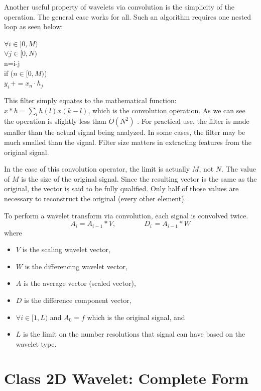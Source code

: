 Another useful property of wavelets via convolution is the simplicity
of the operation. The general case works for all.  Such an algorithm
requires one nested loop as seen below:

\begin{tt}
\begin{tabbing}
$\forall i\in \lbrack 0,M)$ \\
\qquad $\forall j\in \lbrack 0,N)$ \\
\qquad \qquad n=i-j \\
\qquad \qquad if ($n\in \lbrack 0,M)$) \\
\qquad \qquad \qquad $y_{i\,}+=x_{n}\cdot h_{j\,}$
\end{tabbing}
\end{tt}

This filter simply equates to the mathematical function: $x\ast
h=\sum_{l}h(l)x(k-l)$, which is the convolution operation. As we can
see the operation is slightly less than $O(N^{2})$ . For practical
use, the filter is made smaller than the actual signal being
analyzed. In some cases, the filter may be much smalled than the
signal. Filter size matters in extracting features from the original
signal.

In the case of this convolution operator, the limit is actually $M$, not
$N$.  The value of $M$ is the size of the original signal. Since the
resulting vector is the same as the original, the vector is said to be
fully qualified. Only half of those values are necessary to
reconstruct the original (every other element).

To perform a wavelet transform via convolution, each signal is
convolved twice.
\[
A_{i}=A_{i-1}\ast V,
\qquad \qquad
D_{i\,}=A_{i-1}\ast W
\]
where 
\begin{itemize}
\item $V$ is the scaling wavelet vector,
\item $W$ is the differencing wavelet vector,
\item $A$ is the average vector (scaled vector),
\item $D$ is the difference component vector,
\item $\forall i\in \lbrack 1,L)$ and $A_{0}=f$ which is the
original signal, and
\item $L$ is the limit on the number resolutions that signal can have
based on the wavelet type.
\end{itemize}

\section{Class 2D Wavelet: Complete Form}

